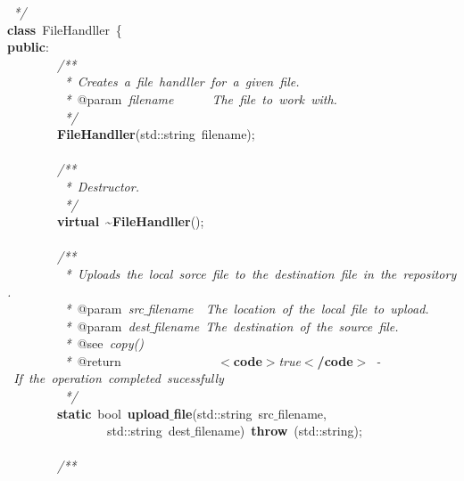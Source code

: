 \mbox{}\textit{\ */} \\
\mbox{}\textbf{class}\ FileHandller\ \{ \\
\mbox{}\textbf{public}: \\
\mbox{}\ \ \ \ \ \ \ \ \textit{/**} \\
\mbox{}\textit{\ \ \ \ \ \ \ \ \ *\ Creates\ a\ file\ handller\ for\ a\ given\ file.} \\
\mbox{}\textit{\ \ \ \ \ \ \ \ \ *\ }@param\textit{\ filename\ \ \ \ \ \ The\ file\ to\ work\ with.} \\
\mbox{}\textit{\ \ \ \ \ \ \ \ \ */} \\
\mbox{}\ \ \ \ \ \ \ \ \textbf{FileHandller}(std::string\ filename); \\
\mbox{} \\
\mbox{}\ \ \ \ \ \ \ \ \textit{/**} \\
\mbox{}\textit{\ \ \ \ \ \ \ \ \ *\ Destructor.} \\
\mbox{}\textit{\ \ \ \ \ \ \ \ \ */} \\
\mbox{}\ \ \ \ \ \ \ \ \textbf{virtual}\ \textasciitilde{}\textbf{FileHandller}(); \\
\mbox{} \\
\mbox{}\ \ \ \ \ \ \ \ \textit{/**} \\
\mbox{}\textit{\ \ \ \ \ \ \ \ \ *\ Uploads\ the\ local\ sorce\ file\ to\ the\ destination\ file\ in\ the\ repository.} \\
\mbox{}\textit{\ \ \ \ \ \ \ \ \ *\ }@param\textit{\ src$\_$filename\ \ The\ location\ of\ the\ local\ file\ to\ upload.} \\
\mbox{}\textit{\ \ \ \ \ \ \ \ \ *\ }@param\textit{\ dest$\_$filename\ The\ destination\ of\ the\ source\ file.} \\
\mbox{}\textit{\ \ \ \ \ \ \ \ \ *\ }@see\textit{\ copy()} \\
\mbox{}\textit{\ \ \ \ \ \ \ \ \ *\ }@return\textit{\ \ \ \ \ \ \ \ \ \ \ \ \ \ \ }\textbf{$<$code$>$}\textit{true}\textbf{$<$/code$>$}\textit{\ -\ If\ the\ operation\ completed\ sucessfully} \\
\mbox{}\textit{\ \ \ \ \ \ \ \ \ */} \\
\mbox{}\ \ \ \ \ \ \ \ \textbf{static}\ bool\ \textbf{upload$\_$file}(std::string\ src$\_$filename, \\
\mbox{}\ \ \ \ \ \ \ \ \ \ \ \ \ \ \ \ std::string\ dest$\_$filename)\ \textbf{throw}\ (std::string); \\
\mbox{} \\
\mbox{}\ \ \ \ \ \ \ \ \textit{/**} \\

